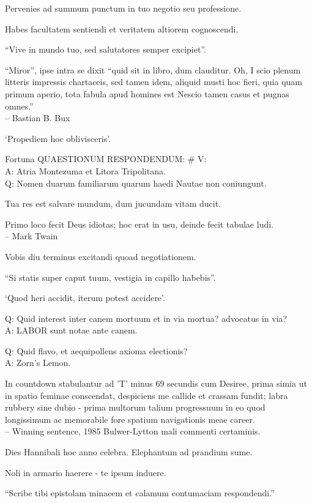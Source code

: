 \documentclass[titlepage,12pt]{memoir}
\begin{document}
Pervenies ad summum punctum in tuo negotio seu professione.

Habes facultatem sentiendi et veritatem altiorem cognoscendi.

“Vive in mundo tuo, sed salutatores semper excipiet”.

“Miror”, ipse intra se dixit “quid sit in libro, dum clauditur. Oh, I
scio plenum litteris impressis chartaceis, sed tamen idem, aliquid musti
hoc fieri, quia quam primum aperio, tota fabula apud homines est
Nescio tamen casus et pugnas omnes.”
\\-- Bastian B. Bux

‘Propediem hoc oblivisceris’.

Fortuna QUAESTIONUM RESPONDENDUM: \# V:\\
A: Atria Montezuma et Litora Tripolitana.
\\Q: Nomen duarum familiarum quarum haedi Nautae non coniungunt.

Tua res est salvare mundum, dum jucundam vitam ducit.

Primo loco fecit Deus idiotas; hoc erat in usu, deinde fecit
tabulae ludi.
\\-- Mark Twain

Vobis diu terminus excitandi quoad negotiationem.

“Si statis super caput tuum, vestigia in capillo habebis”.

‘Quod heri accidit, iterum potest accidere’.

Q: Quid interest inter canem mortuum et in via mortua?
advocatus in via?\\
A: LABOR sunt notae ante canem.

Q: Quid flavo, et aequipollens axioma electionis?\\
A: Zorn’s Lemon.

In countdown stabulantur ad ’T’ minus 69 secundis cum Desiree, prima
simia ut in spatio feminae conscendat, despiciens me callide et crassam fundit;
labra rubbery sine dubio - prima multorum talium progressuum in eo quod
longissimum ac memorabile fore spatium navigationis meae
career.
\\-- Winning sentence, 1985 Bulwer-Lytton mali commenti certaminis.

Dies Hannibali hoc anno celebra. Elephantum ad prandium sume.

Noli in armario haerere - te ipsum induere.

“Scribe tibi epistolam minacem et calamum contumaciam respondendi.”
\end{document}
